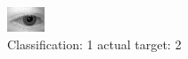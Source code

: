 \begin{figure}[h!]
\begin{center}
\includegraphics[width=0.60\columnwidth]{figures/ID432_class_1_target_2.png}
\end{center}
\caption{ Classification: 1 actual target: 2}
\label{fig:ID432_class_1_target_2}
\end{figure}

